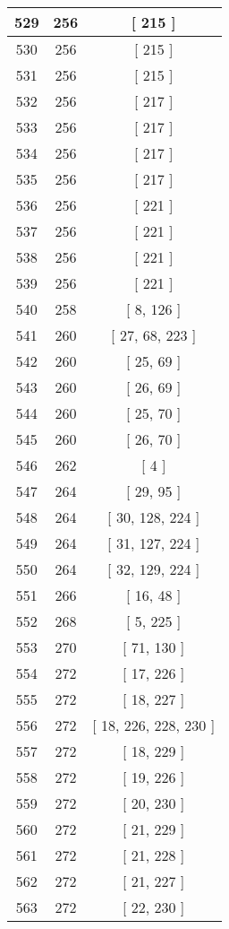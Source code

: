\begin{center}
\begin{longtable}[H]{|| c c c ||}
\hline
529 & 256 & [ 215 ] \\ 
\hline
530 & 256 & [ 215 ] \\ 
\hline
531 & 256 & [ 215 ] \\ 
\hline
532 & 256 & [ 217 ] \\ 
\hline
533 & 256 & [ 217 ] \\ 
\hline
534 & 256 & [ 217 ] \\ 
\hline
535 & 256 & [ 217 ] \\ 
\hline
536 & 256 & [ 221 ] \\ 
\hline
537 & 256 & [ 221 ] \\ 
\hline
538 & 256 & [ 221 ] \\ 
\hline
539 & 256 & [ 221 ] \\ 
\hline
540 & 258 & [ 8, 126 ] \\ 
\hline
541 & 260 & [ 27, 68, 223 ] \\ 
\hline
542 & 260 & [ 25, 69 ] \\ 
\hline
543 & 260 & [ 26, 69 ] \\ 
\hline
544 & 260 & [ 25, 70 ] \\ 
\hline
545 & 260 & [ 26, 70 ] \\ 
\hline
546 & 262 & [ 4 ] \\ 
\hline
547 & 264 & [ 29, 95 ] \\ 
\hline
548 & 264 & [ 30, 128, 224 ] \\ 
\hline
549 & 264 & [ 31, 127, 224 ] \\ 
\hline
550 & 264 & [ 32, 129, 224 ] \\ 
\hline
551 & 266 & [ 16, 48 ] \\ 
\hline
552 & 268 & [ 5, 225 ] \\ 
\hline
553 & 270 & [ 71, 130 ] \\ 
\hline
554 & 272 & [ 17, 226 ] \\ 
\hline
555 & 272 & [ 18, 227 ] \\ 
\hline
556 & 272 & [ 18, 226, 228, 230 ] \\ 
\hline
557 & 272 & [ 18, 229 ] \\ 
\hline
558 & 272 & [ 19, 226 ] \\ 
\hline
559 & 272 & [ 20, 230 ] \\ 
\hline
560 & 272 & [ 21, 229 ] \\ 
\hline
561 & 272 & [ 21, 228 ] \\ 
\hline
562 & 272 & [ 21, 227 ] \\ 
\hline
563 & 272 & [ 22, 230 ] \\ 
\hline

\end{longtable}
\end{center}
